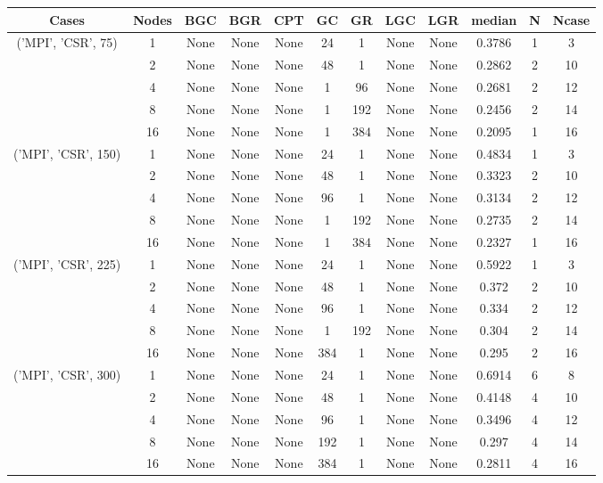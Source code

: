 \begin{tabular}{cccccccccccc}
\hline
Cases & Nodes& BGC& BGR& CPT& GC& GR& LGC& LGR& median & N & Ncase \\
\hline
\multirow{5}{*}{('MPI', 'CSR', 75)}& 1& None& None& None& 24& 1& None& None& 0.3786& 1& 3\\
& 2& None& None& None& 48& 1& None& None& 0.2862& 2& 10\\
& 4& None& None& None& 1& 96& None& None& 0.2681& 2& 12\\
& 8& None& None& None& 1& 192& None& None& 0.2456& 2& 14\\
& 16& None& None& None& 1& 384& None& None& 0.2095& 1& 16\\
\hline
\multirow{5}{*}{('MPI', 'CSR', 150)}& 1& None& None& None& 24& 1& None& None& 0.4834& 1& 3\\
& 2& None& None& None& 48& 1& None& None& 0.3323& 2& 10\\
& 4& None& None& None& 96& 1& None& None& 0.3134& 2& 12\\
& 8& None& None& None& 1& 192& None& None& 0.2735& 2& 14\\
& 16& None& None& None& 1& 384& None& None& 0.2327& 1& 16\\
\hline
\multirow{5}{*}{('MPI', 'CSR', 225)}& 1& None& None& None& 24& 1& None& None& 0.5922& 1& 3\\
& 2& None& None& None& 48& 1& None& None& 0.372& 2& 10\\
& 4& None& None& None& 96& 1& None& None& 0.334& 2& 12\\
& 8& None& None& None& 1& 192& None& None& 0.304& 2& 14\\
& 16& None& None& None& 384& 1& None& None& 0.295& 2& 16\\
\hline
\multirow{5}{*}{('MPI', 'CSR', 300)}& 1& None& None& None& 24& 1& None& None& 0.6914& 6& 8\\
& 2& None& None& None& 48& 1& None& None& 0.4148& 4& 10\\
& 4& None& None& None& 96& 1& None& None& 0.3496& 4& 12\\
& 8& None& None& None& 192& 1& None& None& 0.297& 4& 14\\
& 16& None& None& None& 384& 1& None& None& 0.2811& 4& 16\\
\hline
\end{tabular}



